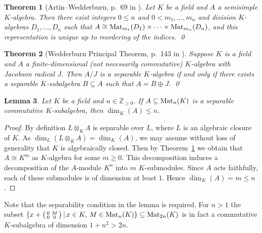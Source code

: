 \documentclass{amsart}
\theoremstyle{plain}
\newtheorem{theorem}{Theorem}[section]
\newtheorem{lemma}[theorem]{Lemma}
\theoremstyle{definition}
\newcommand{\tensor}{\otimes}
\newcommand{\Z}{\ensuremath{\mathbb{Z}}}
\begin{document}
\begin{theorem}[Artin--Wedderburn, p.\ 69 in \cite{wedderburn_book}]\label{thm:artin-wedderburn}
	Let \(K\) be a field and \(A\) a semisimple \(K\)-algebra. Then there exist integers \(0\leq n\) and \(0<m_1,\dotsc,m_n\) and division \(K\)-algebras \(D_1,\dotsc,D_n\) such that  \(A\cong\textup{Mat}_{m_1}(D_1)\times\dotsm\times\textup{Mat}_{m_n}(D_{n})\), and this representation is unique up to reordering of the indices. \qed
\end{theorem}


\begin{theorem}[Wedderburn Principal Theorem, p.\ 143 in \cite{wedderburn_book}]\label{thm:wedderburn}
	Suppose \(K\) is a field and \(A\) a finite-dimensional (not necessarily commutative) \(K\)-algebra with Jacobson radical \(J\). Then \(A/J\) is a separable \(K\)-algebra if and only if there exists a separable \(K\)-subalgebra \(B\subseteq A\) such that \(A=B \oplus J\). \qed
\end{theorem}

\begin{lemma}\label{lem:dimension_bound}
	Let \(K\) be a field and \(n\in\Z_{\geq0}\). 
	If \(A\subseteq\textup{Mat}_n(K)\) is a separable commutative \(K\)-subalgebra, then \(\dim_K(A)\leq n\).
\end{lemma}
\begin{proof}
	By definition \(L\tensor_K A\) is separable over \(L\), where \(L\) is an algebraic closure of \(K\).
	As \(\dim_{L}(L\tensor_KA)=\dim_K(A)\), we may assume without loss of generality that \(K\) is algebraically closed. 
	Then by Theorem~\ref{thm:artin-wedderburn} we obtain that \(A\cong K^m\) as \(K\)-algebra for some \(m\geq 0\).
	This decomposition induces a decomposition of the \(A\)-module \(K^n\) into \(m\) \(K\)-submodules. Since \(A\) acts faithfully, each of these submodules is of dimension at least \(1\). Hence \(\dim_K(A)=m\leq n\).
\end{proof}

Note that the separability condition in the lemma is required. For \(n>1\) the subset \(\{ x+ \big(\begin{smallmatrix} 0 & M \\ 0 & 0 \end{smallmatrix}\big)\,|\, x\in K,\, M\in\textup{Mat}_n(K)\}\subseteq\textup{Mat}_{2n}(K)\) is in fact a commutative \(K\)-subalgebra of dimension \(1+n^2>2n\).
\end{document}
